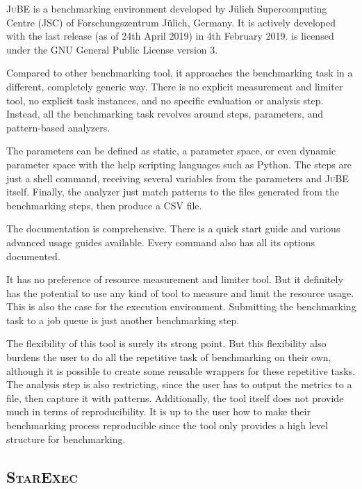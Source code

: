 \textsc{JuBE} \citep{frings2010flexible} is a benchmarking environment developed by Jülich Supercomputing Centre (JSC) of Forschungszentrum Jülich, Germany.
It is actively developed  with the last release (as of 24th April 2019) in 4th February 2019.
 is licensed under the GNU General Public License version 3.

Compared to other benchmarking tool, it approaches the benchmarking task in a different, completely generic way.
There is no explicit measurement and limiter tool, no explicit task instances, and no specific evaluation or analysis step.
Instead, all the benchmarking task revolves around steps, parameters, and pattern-based analyzers.

The parameters can be defined as static, a parameter space, or even dynamic parameter space with the help scripting languages such as Python.
The steps are just a shell command, receiving several variables from the parameters and \textsc{JuBE} itself.
Finally, the analyzer just match patterns to the files generated from the benchmarking steps, then produce a CSV file.

The documentation is comprehensive.
There is a quick start guide and various advanced usage guides available.
Every command also has all its options documented.

It has no preference of resource measurement and limiter tool.
But it definitely has the potential to use any kind of tool to measure and limit the resource usage.
This is also the case for the execution environment.
Submitting the benchmarking task to a job queue is just another benchmarking step.

The flexibility of this tool is surely its strong point.
But this flexibility also burdens the user to do all the repetitive task of benchmarking on their own, although it is possible to create some reusable wrappers for these repetitive tasks.
The analysis step is also restricting, since the user has to output the metrics to a file, then capture it with patterns.
Additionally, the tool itself does not provide much in terms of reproducibility.
It is up to the user how to make their benchmarking process reproducible since the tool only provides a high level structure for benchmarking.


\subsection{\textsc{StarExec}}

